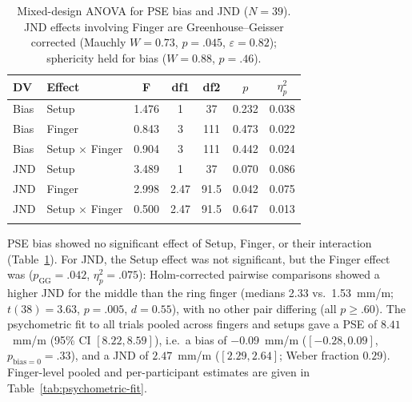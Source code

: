 \begin{table}[!h]
\centering
\setlength{\tabcolsep}{3.5pt}%
\renewcommand{\arraystretch}{0.95}%
\caption{Mixed-design ANOVA for PSE bias and JND ($N=39$). JND effects involving Finger are Greenhouse--Geisser corrected (Mauchly $W=0.73$, $p=.045$, $\varepsilon=0.82$); sphericity held for bias ($W=0.88$, $p=.46$).}
\label{tab:anova}
\begin{tabular}{@{}llccccc@{}}
\toprule\noalign{}
DV & Effect & F & df1 & df2 & \(p\) & $\eta_{p}^{2}$ \\
\midrule\noalign{}
Bias & Setup & 1.476 & 1 & 37 & 0.232 & 0.038 \\
Bias & Finger & 0.843 & 3 & 111 & 0.473 & 0.022 \\
Bias & Setup $\times$ Finger & 0.904 & 3 & 111 & 0.442 & 0.024 \\
JND & Setup & 3.489 & 1 & 37 & 0.070 & 0.086 \\
JND & Finger & 2.998 & 2.47 & 91.5 & 0.042 & 0.075 \\
JND & Setup $\times$ Finger & 0.500 & 2.47 & 91.5 & 0.647 & 0.013 \\
\bottomrule\noalign{}
\end{tabular}%
\end{table}

PSE bias showed no significant effect of Setup, Finger, or their interaction (Table~\ref{tab:anova}). For JND, the Setup effect was not significant, but the Finger effect was ($p_{\mathrm{GG}}=.042$, $\eta_p^2=.075$): Holm-corrected pairwise comparisons showed a higher JND for the middle than the ring finger (medians 2.33 vs.\ 1.53~mm/m; $t(38)=3.63$, $p=.005$, $d=0.55$), with no other pair differing (all $p\geq.60$). The psychometric fit to all trials pooled across fingers and setups gave a PSE of $8.41$~mm/m (95\% CI $[8.22, 8.59]$), i.e.\ a bias of $-0.09$~mm/m ($[-0.28, 0.09]$, $p_{\mathrm{bias}=0}=.33$), and a JND of $2.47$~mm/m ($[2.29, 2.64]$; Weber fraction $0.29$). Finger-level pooled and per-participant estimates are given in Table~\ref{tab:psychometric-fit}.

